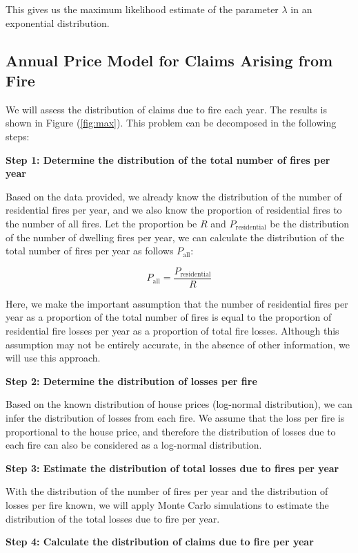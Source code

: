 \documentclass[12pt]{article}  %
\begin{document}
This gives us the maximum likelihood estimate of the parameter $\lambda$ in an exponential distribution.

\subsection{Annual Price Model for Claims Arising from Fire}

We will assess the distribution of claims due to fire each year. The results is shown in Figure (\ref{fig:max}). This problem can be decomposed in the following steps:

\textbf{Step 1: Determine the distribution of the total number of fires per year}

Based on the data provided, we already know the distribution of the number of residential fires per year, and we also know the proportion of residential fires to the number of all fires. Let the proportion be $R$ and $P_{\text{residential}}$ be the distribution of the number of dwelling fires per year, we can calculate the distribution of the total number of fires per year as follows $P_{\text{all}}$:

$$
P_{\text{all}} = \frac{P_{\text{residential}}}{R}
$$

Here, we make the important assumption that the number of residential fires per year as a proportion of the total number of fires is equal to the proportion of residential fire losses per year as a proportion of total fire losses. Although this assumption may not be entirely accurate, in the absence of other information, we will use this approach.

\textbf{Step 2: Determine the distribution of losses per fire}

Based on the known distribution of house prices (log-normal distribution), we can infer the distribution of losses from each fire. We assume that the loss per fire is proportional to the house price, and therefore the distribution of losses due to each fire can also be considered as a log-normal distribution.

\textbf{Step 3: Estimate the distribution of total losses due to fires per year}

With the distribution of the number of fires per year and the distribution of losses per fire known, we will apply Monte Carlo simulations\textsuperscript{\cite{MonteCarlo}} to estimate the distribution of the total losses due to fire per year.

\textbf{Step 4: Calculate the distribution of claims due to fire per year}
\end{document}
